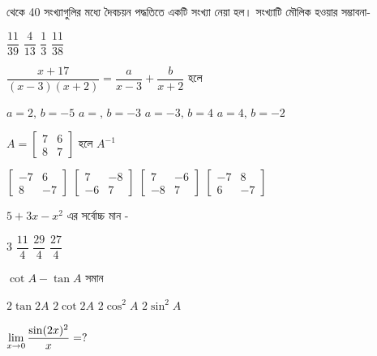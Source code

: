 \documentclass[addpoints]{exam}
\begin{document}
\begin{questions}
 থেকে 40 সংখ্যাগুলির মধ্যে দৈবচয়ন পদ্ধতিতে একটি সংখ্যা নেয়া হল। সংখ্যাটি মৌলিক হওয়ার সম্ভাবনা-

\begin{oneparchoices}
\choice $ \dfrac{11}{39} $
\choice  $ \dfrac{4}{13} $
\choice $ \dfrac{1}{3} $
\choice $ \dfrac{11}{38} $
\end{oneparchoices}

\question  $ \dfrac{x+17}{(x-3)(x+2)}=\dfrac{a}{x-3}+\dfrac{b}{x+2} $ হলে

\begin{oneparchoices}
\choice $ a=2,\,b=-5 $
\choice $ a=,\,b=-3 $
\choice $ a=-3,\,b=4 $
\choice $ a=4,\,b=-2 $
\end{oneparchoices}

\question  $A = \begin{bmatrix}
7 & 6 \\
8 & 7
\end{bmatrix} $ হলে $ A^{-1} $ 

\begin{oneparchoices}
\choice  $\begin{bmatrix}
-7 & 6 \\
8 & -7
\end{bmatrix} $
\choice  $\begin{bmatrix}
7 & -8 \\
-6 & 7
\end{bmatrix} $
\choice $\begin{bmatrix}
7 & -6 \\
-8 & 7
\end{bmatrix} $
\choice  $\begin{bmatrix}
-7 & 8 \\
6 & -7
\end{bmatrix} $
\end{oneparchoices}

 \question  $ 5+3x-x^{2} $ এর সর্বোচ্চ মান -

\begin{oneparchoices}
\choice $ 3 $
\choice $ \dfrac{11}{4} $
\choice $ \dfrac{29}{4} $
\choice $ \dfrac{27}{4} $
\end{oneparchoices}

\question  $ \cot A -\tan A $ সমান 

\begin{oneparchoices}
\choice  $ 2\tan 2A $
\choice  $ 2\cot 2A $
\choice  $ 2\cos^{2} A $
\choice  $ 2\sin^{2}A$
\end{oneparchoices}

\question  $ \mathlarger{\lim_{x\to 0} \dfrac{\sin (2x)^{2}}{x}}=? $ 


\end{questions}
\end{document}

